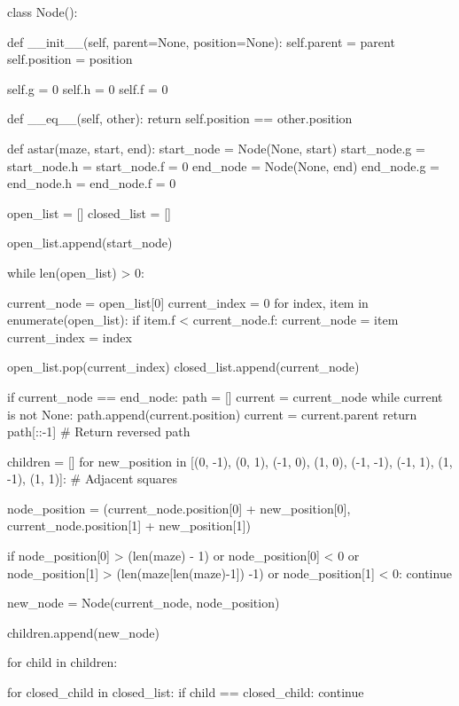 \begin{python}

class Node():

    def __init__(self, parent=None, position=None):
        self.parent = parent
        self.position = position

        self.g = 0
        self.h = 0
        self.f = 0

    def __eq__(self, other):
        return self.position == other.position

def astar(maze, start, end):
    start_node = Node(None, start)
    start_node.g = start_node.h = start_node.f = 0
    end_node = Node(None, end)
    end_node.g = end_node.h = end_node.f = 0

    open_list = []
    closed_list = []

    open_list.append(start_node)

    while len(open_list) > 0:

        current_node = open_list[0]
        current_index = 0
        for index, item in enumerate(open_list):
            if item.f < current_node.f:
                current_node = item
                current_index = index

        open_list.pop(current_index)
        closed_list.append(current_node)

        if current_node == end_node:
            path = []
            current = current_node
            while current is not None:
                path.append(current.position)
                current = current.parent
            return path[::-1] # Return reversed path

        children = []
        for new_position in [(0, -1), (0, 1), (-1, 0), (1, 0), (-1, -1), (-1, 1), (1, -1), (1, 1)]: # Adjacent squares

            node_position = (current_node.position[0] + new_position[0], current_node.position[1] + new_position[1])

            if node_position[0] > (len(maze) - 1) or node_position[0] < 0 or node_position[1] > (len(maze[len(maze)-1]) -1) or node_position[1] < 0:
                continue

            new_node = Node(current_node, node_position)

            children.append(new_node)

        for child in children:

            for closed_child in closed_list:
                if child == closed_child:
                    continue


\end{python}
